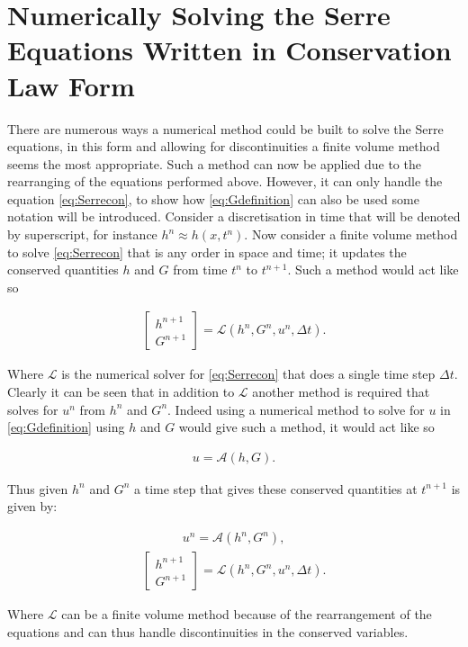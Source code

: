 \documentclass[SingleSpace,12pt]{Serre_ASCE}
\begin{document}
\section{Numerically Solving the Serre Equations Written in Conservation Law Form}
\label{section:Solving the Serre Equations Written in Conservation Law Form}
There are numerous ways a numerical method could be built to solve the Serre equations, in this form and allowing for discontinuities a finite volume method seems the most appropriate. Such a method can now be applied due to the rearranging of the equations performed above. However, it can only handle the equation \eqref{eq:Serrecon}, to show how \eqref{eq:Gdefinition} can also be used some notation will be introduced. Consider a discretisation in time that will be denoted by superscript, for instance $h^n  \approx h(x,t^n)$. Now consider a finite volume method to solve \eqref{eq:Serrecon} that is any order in space and time; it updates the conserved quantities $h$ and $G$ from time $t^n$ to $t^{n+1}$. Such a method would act like so
\begin{linenomath*}
\begin{gather}
\left[\begin{array}{c}
 h^{n+1} \\
 G^{n+1} \end{array}\right] = \mathcal{L}(h^{n},G^{n},u^n,\Delta t).
\label{eq:L}
\end{gather}
\end{linenomath*}
Where $\mathcal{L}$ is the numerical solver for \eqref{eq:Serrecon} that does a single time step $\Delta t$. Clearly it can be seen that in addition to $\mathcal{L}$ another method is required that solves for $u^n$ from $h^n$ and $G^n$. Indeed using a numerical method to solve for $u$ in \eqref{eq:Gdefinition} using $h$ and $G$ would give such a method, it would act like so
\begin{linenomath*}
\begin{gather}
u = \mathcal{A}(h,G).
\label{eq:A}
\end{gather}
\end{linenomath*}
Thus given $h^n$ and $G^n$ a time step that gives these conserved quantities at $t^{n+1}$ is given by:
\begin{linenomath*}
\begin{gather*}
u^n = \mathcal{A}(h^n,G^n),
\end{gather*}
\begin{gather*}
\left[\begin{array}{c}
 h^{n+1} \\
 G^{n+1} \end{array}\right] = \mathcal{L}(h^{n},G^{n},u^n,\Delta t).
\end{gather*}
\end{linenomath*}
Where $\mathcal{L}$ can be a finite volume method because of the rearrangement of the equations and can thus handle discontinuities in the conserved variables.
\end{document}
